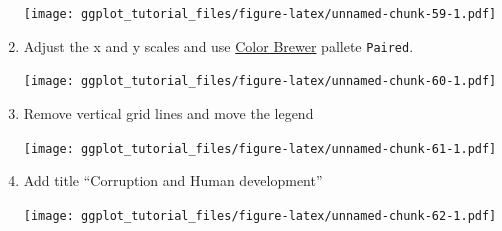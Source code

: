 \documentclass[]{article}
\theoremstyle{definition}
\theoremstyle{definition}
\theoremstyle{definition}
\theoremstyle{remark}
\begin{document}
\begin{enumerate}
  \texttt{[image: ggplot\_tutorial\_files/figure-latex/unnamed-chunk-59-1.pdf]}
\item
  Adjust the x and y scales and use \href{http://colorbrewer2.org}{Color
  Brewer} pallete \texttt{Paired}.

  \texttt{[image: ggplot\_tutorial\_files/figure-latex/unnamed-chunk-60-1.pdf]}
\item
  Remove vertical grid lines and move the legend

  \texttt{[image: ggplot\_tutorial\_files/figure-latex/unnamed-chunk-61-1.pdf]}
\item
  Add title ``Corruption and Human development''

  \texttt{[image: ggplot\_tutorial\_files/figure-latex/unnamed-chunk-62-1.pdf]}
\end{enumerate}
\end{document}
